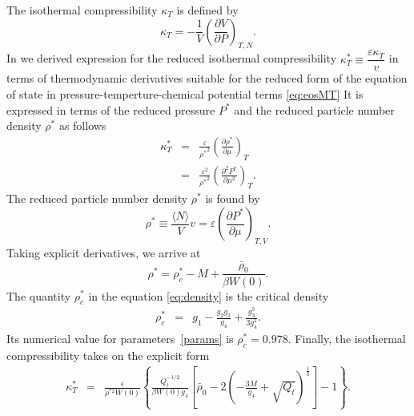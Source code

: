The isothermal compressibility $\kappa_T$ is defined by
\begin{equation}
	\label{def:isotherm_compres}
	\kappa_T = -\frac{1}{V}\left(\frac{\partial V}{\partial P}\right)_{T, N}.
\end{equation}
In \cite{DKRP24arxiv,DKRP24} we derived expression for the reduced isothermal compressibility $\kappa^*_T \equiv \dfrac{\varepsilon \kappa_T}{v}$  in terms of thermodynamic derivatives suitable for the reduced form of the equation of state in pressure-temperture-chemical potential terms \eqref{eq:eosMT} 
It is expressed in terms of the reduced pressure $P^*$ and the reduced particle number density $\rho^*$ as follows
\begin{eqnarray}
	\label{eq:kappa_star_m1}
	\kappa^*_T & = & \frac{\varepsilon}{{\rho^*}^2} \left(\frac{\partial \rho^*}{\partial \mu}\right)_T
	\\
	\label{eq:kappa_star_m}
	& = & \frac{\varepsilon^2}{{\rho^*}^2} \left(\frac{\partial^2 P^*}{\partial \mu^2}\right)_T.
\end{eqnarray}
The reduced particle number density $\rho^*$ is found by 
\begin{equation}
	\rho^* \equiv \frac{\langle N \rangle}{V} v = \varepsilon\left(\frac{\partial P^*}{\partial \mu}\right)_{T,V}.
\end{equation}
Taking explicit derivatives, we arrive at
\begin{equation}\label{eq:density}
	\rho^* = \rho^*_c - M + \frac{ \bar \rho_0}{\beta W(0)}.
\end{equation}
The quantity $\rho^*_c$ in the equation \eqref{eq:density} is the critical density~\cite{KD20,DKRP24arxiv,DKRP24}
\begin{eqnarray}\label{eq:crit_dens}
	\rho^*_c & = &  g_1 - \frac{g_2 g_3}{g_4} + \frac{g_3^3}{3g_4^2}.
\end{eqnarray}
Its numerical value for parameters~\eqref{params} is $\rho^*_c = 0.978$.
Finally, the isothermal compressibility takes on the explicit form  
\begin{eqnarray}
	\kappa_T^* & = & \frac{\epsilon}{\rho^{*2} W(0)} \left\{   \frac{Q_t^{-1/2}}{\beta W(0) g_4} \left[ \bar \rho_0 - 2 \left( - \frac{3M}{g_4} + \sqrt{Q_t} \right)^{\frac{1}{3}} \right] -1 \right\}.
\end{eqnarray}
